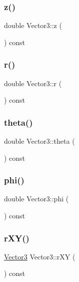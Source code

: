\subsubsection{\texorpdfstring{z()}{z()}}
{\footnotesize\ttfamily double Vector3\+::z (\begin{DoxyParamCaption}{ }\end{DoxyParamCaption}) const}

\mbox{\label{class_vector3_acbf6dfc367121fd82a153c4593306145}} 
\subsubsection{\texorpdfstring{r()}{r()}}
{\footnotesize\ttfamily double Vector3\+::r (\begin{DoxyParamCaption}{ }\end{DoxyParamCaption}) const}

\mbox{\label{class_vector3_a30c86ee94c98070b469a56fa4f7fde4f}} 
\subsubsection{\texorpdfstring{theta()}{theta()}}
{\footnotesize\ttfamily double Vector3\+::theta (\begin{DoxyParamCaption}{ }\end{DoxyParamCaption}) const}

\mbox{\label{class_vector3_af04a3d08dae7f1ba36ee3feaf3bc8a4c}} 
\subsubsection{\texorpdfstring{phi()}{phi()}}
{\footnotesize\ttfamily double Vector3\+::phi (\begin{DoxyParamCaption}{ }\end{DoxyParamCaption}) const}

\mbox{\label{class_vector3_aaf2a01831ab227b33593145fc21f74d6}} 
\subsubsection{\texorpdfstring{rXY()}{rXY()}}
{\footnotesize\ttfamily \mbox{\hyperlink{class_vector3}{Vector3}} Vector3\+::r\+XY (\begin{DoxyParamCaption}{ }\end{DoxyParamCaption}) const}

